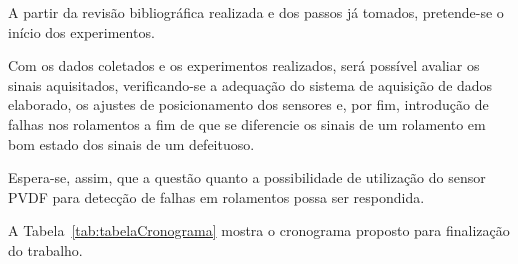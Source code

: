 \documentclass[
	12pt,				
	oneside,			
	a4paper,			
	english,			
	brazil,			
	]{abntex2ppgsi}
\begin{document}
A partir da revisão bibliográfica realizada e dos passos já tomados, pretende-se o início dos experimentos. 

Com os dados coletados e os experimentos realizados, será possível avaliar os sinais aquisitados, verificando-se a adequação do sistema de aquisição de dados elaborado, os ajustes de posicionamento dos sensores e, por fim, introdução de falhas nos rolamentos a fim de que se diferencie os sinais de um rolamento em bom estado dos sinais de um defeituoso. 

Espera-se, assim, que a questão quanto a possibilidade de utilização do sensor PVDF para detecção de falhas em rolamentos possa ser respondida.

A Tabela~\ref{tab:tabelaCronograma} mostra o cronograma proposto para finalização do trabalho.
\end{document}
